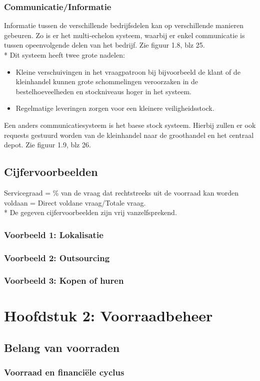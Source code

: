 \documentclass[12pt]{article}
\begin{document}
\subsubsection{Communicatie/Informatie}
Informatie tussen de verschillende bedrijfsdelen kan op verschillende manieren gebeuren. Zo is er het multi-echelon systeem, waarbij er enkel communicatie is tussen opeenvolgende delen van het bedrijf. Zie figuur 1.8, blz 25.\\*
Dit systeem heeft twee grote nadelen:
\begin{itemize}
\item Kleine verschuivingen in het vraagpatroon bij bijvoorbeeld de klant of de kleinhandel kunnen grote schommelingen veroorzaken in de bestelhoeveelheden en stockniveaus hoger in het systeem.
\item Regelmatige leveringen zorgen voor een kleinere veiligheidsstock.
\end{itemize}
Een anders communicatiesysteem is het baese stock systeem. Hierbij zullen er ook requests gestuurd worden van de kleinhandel naar de groothandel en het centraal depot. Zie figuur 1.9, blz 26.
\subsection{Cijfervoorbeelden}
Servicegraad = \% van de vraag dat rechtstreeks uit de voorraad kan worden voldaan = Direct voldane vraag/Totale vraag.\\*
De gegeven cijfervoorbeelden zijn vrij vanzelfsprekend.
\subsubsection{Voorbeeld 1: Lokalisatie}
\subsubsection{Voorbeeld 2: Outsourcing}
\subsubsection{Voorbeeld 3: Kopen of huren}
\clearpage
\section{Hoofdstuk 2: Voorraadbeheer}
\subsection{Belang van voorraden}
\subsubsection{Voorraad en financi\"ele cyclus}
\end{document}
